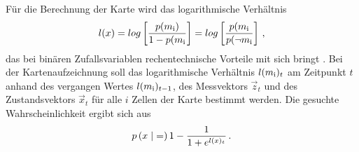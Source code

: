 Für die Berechnung der Karte wird das logarithmische Verhältnis
\begin{equation}
l(x) = log\left[ \frac{p(m_{\text{i}})}{1-p(m_{\text{i}}} \right] = log\left[ \frac{p(m_{\text{i}}}{p(\neg m_{\text{i}}} \right]\,,
\end{equation}
das bei binären Zufallsvariablen  rechentechnische Vorteile mit sich bringt  \cite[S. 94 f]{ProbRob}. Bei der Kartenaufzeichnung soll das logarithmische Verhältnis $l(m_{\text{i}})_t$ am Zeitpunkt $t$ anhand des vergangen Wertes $l(m_{\text{i}})_{t-1}$, des Messvektors $\vec{z}_t$ und des Zustandsvektors $\vec{x}_t$ für alle $i$ Zellen der Karte bestimmt werden. Die gesuchte Wahrscheinlichkeit ergibt sich aus
\begin{equation}
p\left({x} \hspace{1mm} \vert \hspace{1mm} {=}\right) 1 - \frac{1}{1+e^{l(x)_t}}\,.
\end{equation}

